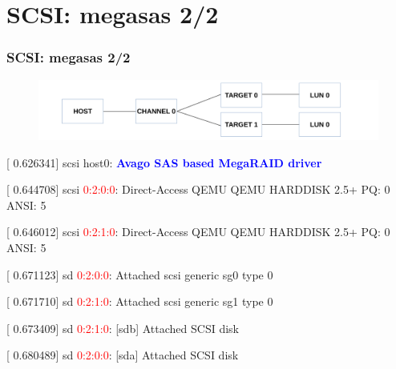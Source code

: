 \documentclass[aspectratio=169]{beamer}
\begin{document}

\section{SCSI: megasas 2/2}
\begin{frame}
\frametitle{SCSI: megasas 2/2}
\begin{figure}
\includegraphics[width=1.0\linewidth]{figures/megasas.pdf}
\end{figure}
\begin{block}{}
[    0.626341] scsi host0: \textbf{\textcolor{blue}{Avago SAS based MegaRAID driver}}

[    0.644708] scsi \textcolor{red}{0:2:0:0}: Direct-Access     QEMU     QEMU HARDDISK    2.5+ PQ: 0 ANSI: 5

[    0.646012] scsi \textcolor{red}{0:2:1:0}: Direct-Access     QEMU     QEMU HARDDISK    2.5+ PQ: 0 ANSI: 5

[    0.671123] sd \textcolor{red}{0:2:0:0}: Attached scsi generic sg0 type 0

[    0.671710] sd \textcolor{red}{0:2:1:0}: Attached scsi generic sg1 type 0

[    0.673409] sd \textcolor{red}{0:2:1:0}: [sdb] Attached SCSI disk

[    0.680489] sd \textcolor{red}{0:2:0:0}: [sda] Attached SCSI disk
\end{block}
\end{frame}

\end{document}
